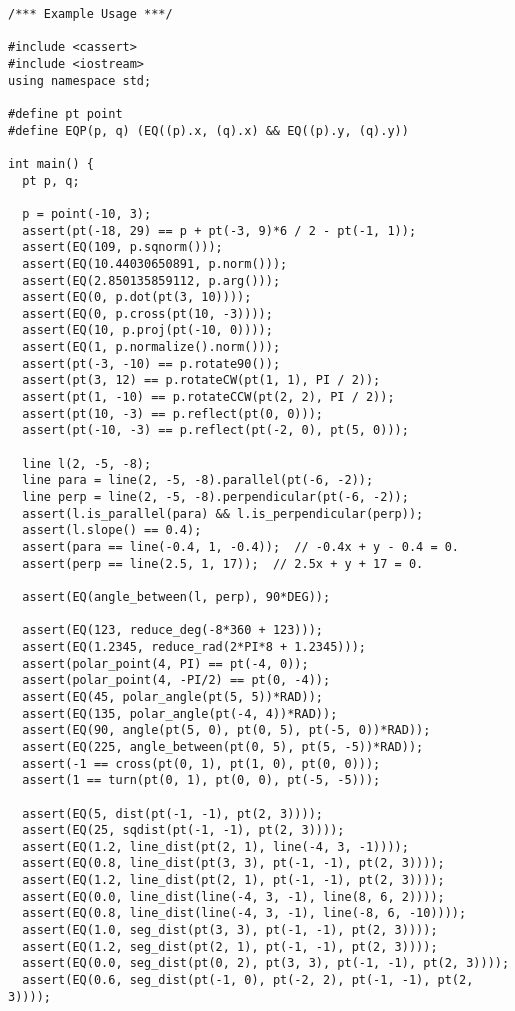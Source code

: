 \begin{lstlisting}
/*** Example Usage ***/

#include <cassert>
#include <iostream>
using namespace std;

#define pt point
#define EQP(p, q) (EQ((p).x, (q).x) && EQ((p).y, (q).y))

int main() {
  pt p, q;

  p = point(-10, 3);
  assert(pt(-18, 29) == p + pt(-3, 9)*6 / 2 - pt(-1, 1));
  assert(EQ(109, p.sqnorm()));
  assert(EQ(10.44030650891, p.norm()));
  assert(EQ(2.850135859112, p.arg()));
  assert(EQ(0, p.dot(pt(3, 10))));
  assert(EQ(0, p.cross(pt(10, -3))));
  assert(EQ(10, p.proj(pt(-10, 0))));
  assert(EQ(1, p.normalize().norm()));
  assert(pt(-3, -10) == p.rotate90());
  assert(pt(3, 12) == p.rotateCW(pt(1, 1), PI / 2));
  assert(pt(1, -10) == p.rotateCCW(pt(2, 2), PI / 2));
  assert(pt(10, -3) == p.reflect(pt(0, 0)));
  assert(pt(-10, -3) == p.reflect(pt(-2, 0), pt(5, 0)));

  line l(2, -5, -8);
  line para = line(2, -5, -8).parallel(pt(-6, -2));
  line perp = line(2, -5, -8).perpendicular(pt(-6, -2));
  assert(l.is_parallel(para) && l.is_perpendicular(perp));
  assert(l.slope() == 0.4);
  assert(para == line(-0.4, 1, -0.4));  // -0.4x + y - 0.4 = 0.
  assert(perp == line(2.5, 1, 17));  // 2.5x + y + 17 = 0.

  assert(EQ(angle_between(l, perp), 90*DEG));

  assert(EQ(123, reduce_deg(-8*360 + 123)));
  assert(EQ(1.2345, reduce_rad(2*PI*8 + 1.2345)));
  assert(polar_point(4, PI) == pt(-4, 0));
  assert(polar_point(4, -PI/2) == pt(0, -4));
  assert(EQ(45, polar_angle(pt(5, 5))*RAD));
  assert(EQ(135, polar_angle(pt(-4, 4))*RAD));
  assert(EQ(90, angle(pt(5, 0), pt(0, 5), pt(-5, 0))*RAD));
  assert(EQ(225, angle_between(pt(0, 5), pt(5, -5))*RAD));
  assert(-1 == cross(pt(0, 1), pt(1, 0), pt(0, 0)));
  assert(1 == turn(pt(0, 1), pt(0, 0), pt(-5, -5)));

  assert(EQ(5, dist(pt(-1, -1), pt(2, 3))));
  assert(EQ(25, sqdist(pt(-1, -1), pt(2, 3))));
  assert(EQ(1.2, line_dist(pt(2, 1), line(-4, 3, -1))));
  assert(EQ(0.8, line_dist(pt(3, 3), pt(-1, -1), pt(2, 3))));
  assert(EQ(1.2, line_dist(pt(2, 1), pt(-1, -1), pt(2, 3))));
  assert(EQ(0.0, line_dist(line(-4, 3, -1), line(8, 6, 2))));
  assert(EQ(0.8, line_dist(line(-4, 3, -1), line(-8, 6, -10))));
  assert(EQ(1.0, seg_dist(pt(3, 3), pt(-1, -1), pt(2, 3))));
  assert(EQ(1.2, seg_dist(pt(2, 1), pt(-1, -1), pt(2, 3))));
  assert(EQ(0.0, seg_dist(pt(0, 2), pt(3, 3), pt(-1, -1), pt(2, 3))));
  assert(EQ(0.6, seg_dist(pt(-1, 0), pt(-2, 2), pt(-1, -1), pt(2, 3))));


\end{lstlisting}
